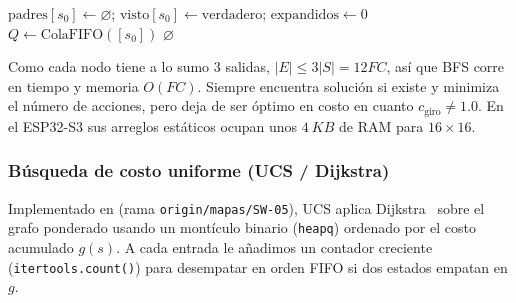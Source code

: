 \begin{algorithm}[H]
  \caption{BFS sobre estados con orientación ( / )}
  \label{alg:bfs}
  $\text{padres}[s_0] \leftarrow \varnothing$; $\text{visto}[s_0] \leftarrow \text{verdadero}$; $\text{expandidos} \leftarrow 0$\;
  $Q \leftarrow \text{ColaFIFO}([s_0])$\;
  \Return $\varnothing$\;
\end{algorithm}

Como cada nodo tiene a lo sumo $3$ salidas, $|E| \le 3|S| = 12FC$, así que BFS corre en tiempo y memoria $O(FC)$. Siempre encuentra solución si existe y minimiza el número de acciones, pero deja de ser óptimo en costo en cuanto $c_{\text{giro}} \ne 1.0$. En el ESP32-S3 sus arreglos estáticos ocupan unos $\SI{4}{KB}$ de RAM para $16 \times 16$.

\subsubsection{Búsqueda de costo uniforme (UCS / Dijkstra)}

Implementado en  (rama \texttt{origin/mapas/SW-05}), UCS aplica Dijkstra~\cite{dijkstra1959note,russell2021aima} sobre el grafo ponderado usando un montículo binario (\texttt{heapq}) ordenado por el costo acumulado $g(s)$. A cada entrada le añadimos un contador creciente (\texttt{itertools.count()}) para desempatar en orden FIFO si dos estados empatan en $g$.

